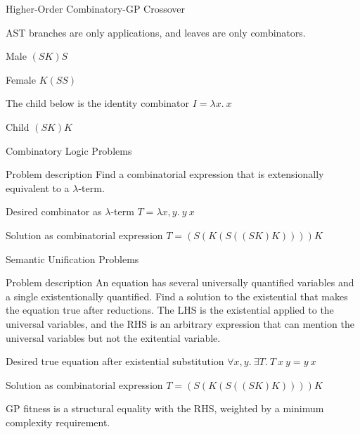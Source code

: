 \documentclass[mathserif]{beamer}
\begin{document}
\begin{frame}{Higher-Order Combinatory-GP Crossover}

AST branches are only applications, and leaves are only combinators.

\begin{block}{Male}
$(SK)S$
\end{block}

\begin{block}{Female}
$K(SS)$
\end{block}

The child below is the identity combinator $I = \lambda x . ~ x$

\begin{block}{Child}
$(SK)K$
\end{block}

\end{frame}

\begin{frame}{Combinatory Logic Problems}

\begin{block}{Problem description}
Find a combinatorial expression that is extensionally equivalent to a $\lambda$-term.
\end{block}

\begin{block}{Desired combinator as $\lambda$-term}
$T = \lambda x,y . ~ y ~ x$
\end{block}

\begin{block}{Solution as combinatorial expression}
$T = (S(K(S((SK)K))))K$
\end{block}

\end{frame}

\begin{frame}{Semantic Unification Problems}

\begin{block}{Problem description}
An equation has several universally quantified variables and a single
existentionally quantified. Find a solution to the existential that
makes the equation true after reductions. The LHS is the existential
applied to the universal variables, and the RHS is an arbitrary
expression that can mention the universal variables but not the
exitential variable.
\end{block}

\begin{block}{Desired true equation after existential substitution}
$\forall x,y . ~ \exists T . ~ T ~ x ~ y = y ~ x$
\end{block}

\begin{block}{Solution as combinatorial expression}
$T = (S(K(S((SK)K))))K$
\end{block}

GP fitness is a structural equality with the RHS, weighted by a
minimum complexity requirement.

\end{frame}
\end{document}
